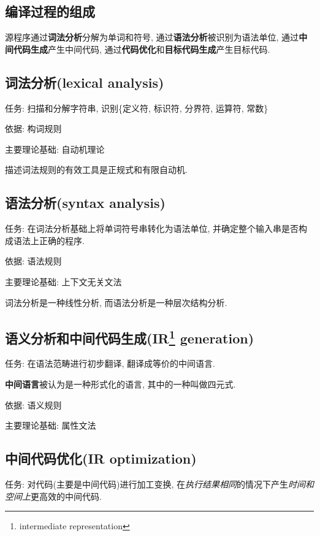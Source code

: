     \subsection{编译过程的组成}

        源程序通过\textbf{词法分析}分解为单词和符号, 通过\textbf{语法分析}被识别为语法单位, 通过\textbf{中间代码生成}产生中间代码, 通过\textbf{代码优化}和\textbf{目标代码生成}产生目标代码.

    \subsection{词法分析(lexical analysis)}

        任务: 扫描和分解字符串, 识别\{定义符, 标识符, 分界符, 运算符, 常数\}

        依据: 构词规则

        主要理论基础: 自动机理论

        描述词法规则的有效工具是正规式和有限自动机.

    \subsection{语法分析(syntax analysis)}

        任务: 在词法分析基础上将单词符号串转化为语法单位, 并确定整个输入串是否构成语法上正确的程序.

        依据: 语法规则

        主要理论基础: 上下文无关文法

        词法分析是一种线性分析, 而语法分析是一种层次结构分析.

    \subsection{语义分析和中间代码生成(IR\protect\footnote{intermediate representation} generation)}

        任务: 在语法范畴进行初步翻译, 翻译成等价的中间语言.

        \textbf{中间语言}被认为是一种形式化的语言, 其中的一种叫做四元式.

        依据: 语义规则

        主要理论基础: 属性文法

    \subsection{中间代码优化(IR optimization)}

        任务: 对代码(主要是中间代码)进行加工变换, 在\textsl{执行结果相同}的情况下产生\textsl{时间和空间上}更高效的中间代码.

